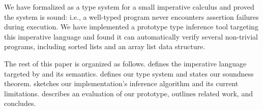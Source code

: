 We have formalized \name as a type system for a small imperative calculus
and proved the system is sound: i.e., a well-typed program never encounters assertion
failures during execution. We have
implemented a prototype type inference tool targeting this
imperative language and found it can automatically verify several
non-trivial programs, including sorted lists and an array list data structure.

The rest of this paper is organized as follows.  defines the
imperative language targeted by \name and its semantics. 
defines our type system and states our soundness theorem.  sketches
our implementation's inference algorithm and its current limitations.
 describes an evaluation of our prototype,  outlines
related work, and  concludes.


